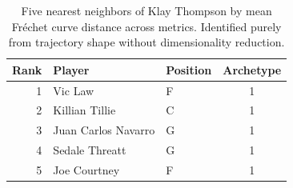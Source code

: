 \begin{table}[htbp]
  \centering\small
  \begin{tabular}{rllc}
    \toprule
    Rank & Player & Position & Archetype \\
    \midrule
    1 & Vic Law & F & 1 \\
    2 & Killian Tillie & C & 1 \\
    3 & Juan Carlos Navarro & G & 1 \\
    4 & Sedale Threatt & G & 1 \\
    5 & Joe Courtney & F & 1 \\
    \bottomrule
  \end{tabular}
  \caption{Five nearest neighbors of Klay Thompson by mean Fr\'{e}chet curve distance across metrics. Identified purely from trajectory shape without dimensionality reduction.}
  \label{tab:Klay_Thompson_frechet_curve_neighbors}
\end{table}

